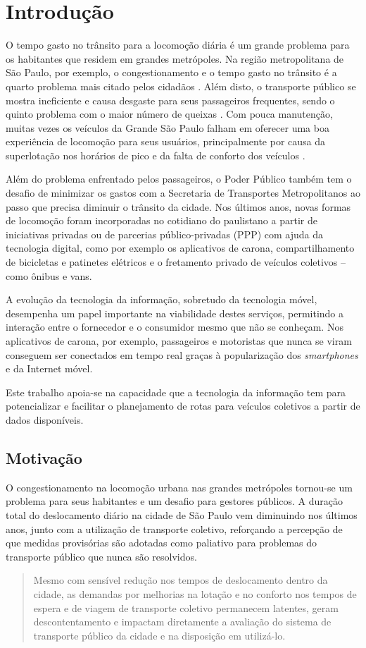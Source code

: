 \chapter{Introdução} 
O tempo gasto no trânsito para a locomoção diária é um grande problema para os habitantes que residem em grandes metrópoles. Na região metropolitana de São Paulo, por exemplo, o congestionamento e o tempo gasto no trânsito é a quarto problema mais citado pelos cidadãos \cite{viveremsp}. Além disto, o transporte público se mostra ineficiente e causa desgaste para seus passageiros frequentes, sendo o quinto problema com o maior número de queixas \cite{mobilize}. Com pouca manutenção, muitas vezes os veículos da Grande São Paulo falham em oferecer uma boa experiência de locomoção para seus usuários, principalmente por causa da superlotação nos horários de pico e da falta de conforto dos veículos \cite{viveremsp}.

Além do problema enfrentado pelos passageiros, o Poder Público também tem o desafio de minimizar os gastos com a Secretaria de Transportes Metropolitanos ao passo que precisa diminuir o trânsito da cidade. Nos últimos anos, novas formas de locomoção foram incorporadas no cotidiano do paulistano a partir de iniciativas privadas ou de parcerias público-privadas (PPP) com ajuda da tecnologia digital, como por exemplo os aplicativos de carona, compartilhamento de bicicletas e patinetes elétricos e o fretamento privado de veículos coletivos -- como ônibus e vans. 

A evolução da tecnologia da informação, sobretudo da tecnologia móvel, desempenha um papel importante na viabilidade destes serviços, permitindo a interação entre o fornecedor e o consumidor mesmo que não se conheçam. Nos aplicativos de carona, por exemplo, passageiros e motoristas que nunca se viram conseguem ser conectados em tempo real graças à popularização dos \emph{smartphones} e da Internet móvel. 

Este trabalho apoia-se na capacidade que a tecnologia da informação tem para potencializar e facilitar o planejamento de rotas para veículos coletivos a partir de dados disponíveis.

\section{Motivação}

O congestionamento na locomoção urbana nas grandes metrópoles tornou-se um problema para seus habitantes e um desafio para gestores públicos. A duração total do deslocamento diário na cidade de São Paulo vem diminuindo nos últimos anos, junto com a utilização de transporte coletivo, reforçando a percepção de que medidas provisórias são adotadas como paliativo para problemas do transporte público que nunca são resolvidos.
\begin{quote}
Mesmo com sensível redução nos tempos de deslocamento dentro da cidade, as demandas por melhorias na lotação e no conforto nos tempos de espera e de viagem de transporte coletivo permanecem latentes, geram descontentamento e impactam diretamente a avaliação do sistema de transporte público da cidade e na disposição em utilizá-lo.
\end{quote}

